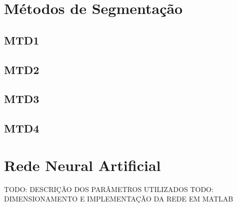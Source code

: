 \section{Métodos de Segmentação}

\subsection{MTD1}
\subsection{MTD2}
\subsection{MTD3}
\subsection{MTD4}

\section{Rede Neural Artificial}

	TODO: DESCRIÇÃO DOS PARÂMETROS UTILIZADOS
	TODO: DIMENSIONAMENTO E IMPLEMENTAÇÃO DA REDE EM MATLAB
